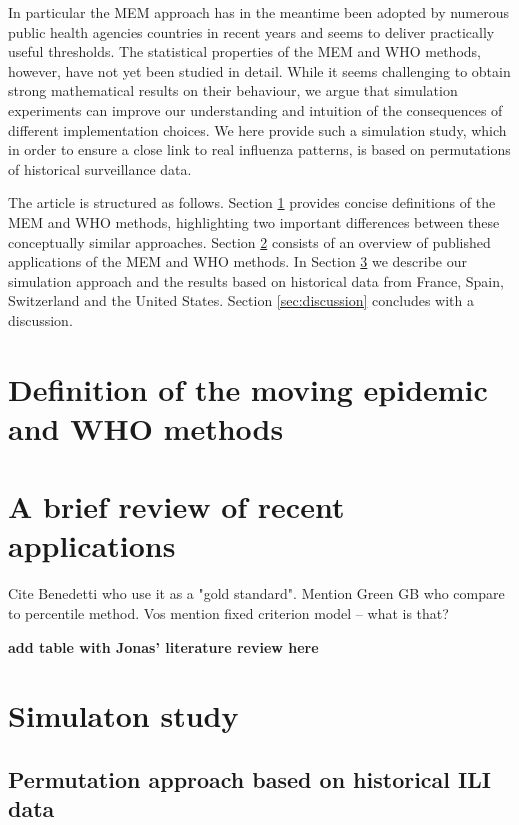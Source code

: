 \documentclass{article}
\begin{document}
In particular the MEM approach has in the meantime been adopted by numerous public health agencies countries in recent years and seems to deliver practically useful thresholds. The statistical properties of the MEM and WHO methods, however, have not yet been studied in detail. While it seems challenging to obtain strong mathematical results on their behaviour, we argue that simulation experiments can improve our understanding and intuition of the consequences of different implementation choices. We here provide such a simulation study, which in order to ensure a close link to real influenza patterns, is based on permutations of historical surveillance data.

The article is structured as follows. Section \ref{sec:definitions} provides concise definitions of the MEM and WHO methods, highlighting two important differences between these conceptually similar approaches. Section \ref{sec:recent_applications} consists of an overview of published applications of the MEM and WHO methods. In Section \ref{sec:simulation} we describe our simulation approach and the results based on historical data from France, Spain, Switzerland and the United States. Section \ref{sec:discussion} concludes with a discussion.

\section{Definition of the moving epidemic and WHO methods}
\label{sec:definitions}

\section{A brief review of recent applications}
\label{sec:recent_applications}

Cite Benedetti who use it as a "gold standard". Mention Green GB who compare to percentile method. Vos mention fixed criterion model -- what is that?


\textbf{add table with Jonas' literature review here}

\section{Simulaton study}
\label{sec:simulation}

\subsection{Permutation approach based on historical ILI data}
\end{document}
